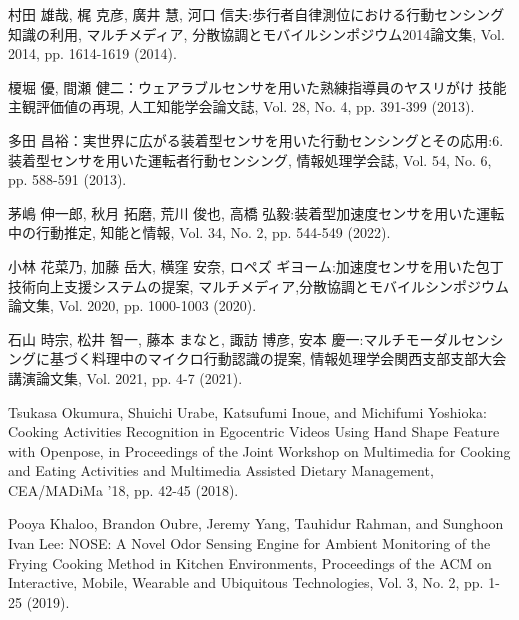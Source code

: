 \begin{thebibliography}{参考文献}
	村田 雄哉, 梶 克彦, 廣井 慧, 河口 信夫:歩行者自律測位における行動センシング知識の利用, マルチメディア, 分散協調とモバイルシンポジウム2014論文集, Vol. 2014, pp. 1614-1619 (2014).
	
	榎堀 優, 間瀬 健二：ウェアラブルセンサを用いた熟練指導員のヤスリがけ
	技能主観評価値の再現, 人工知能学会論文誌, Vol. 28, No. 4, pp. 391-399 (2013).
	
	多田 昌裕：実世界に広がる装着型センサを用いた行動センシングとその応用:6. 装着型センサを用いた運転者行動センシング, 情報処理学会誌, Vol. 54, No. 6, pp. 588-591 (2013).

	茅嶋 伸一郎, 秋月 拓磨, 荒川 俊也, 高橋 弘毅:装着型加速度センサを用いた運転中の行動推定, 知能と情報, Vol. 34, No. 2, pp. 544-549 (2022).


	小林 花菜乃, 加藤 岳大, 横窪 安奈, ロペズ ギヨーム:加速度センサを用いた包丁技術向上支援システムの提案, マルチメディア,分散協調とモバイルシンポジウム論文集, Vol. 2020, pp. 1000-1003 (2020).
	
	石山 時宗, 松井 智一, 藤本 まなと, 諏訪 博彦, 安本 慶一:マルチモーダルセンシングに基づく料理中のマイクロ行動認識の提案, 情報処理学会関西支部支部大会講演論文集, Vol. 2021, pp. 4-7 (2021).

	Tsukasa Okumura, Shuichi Urabe, Katsufumi Inoue, and Michifumi Yoshioka: Cooking Activities Recognition in Egocentric Videos Using Hand Shape Feature with Openpose, in Proceedings of the Joint Workshop on Multimedia for Cooking and Eating Activities and Multimedia Assisted Dietary Management, CEA/MADiMa '18, pp. 42-45 (2018).

	Pooya Khaloo, Brandon Oubre, Jeremy Yang, Tauhidur Rahman, and Sunghoon Ivan Lee: NOSE: A Novel Odor Sensing Engine for Ambient Monitoring of the Frying Cooking Method in Kitchen Environments, Proceedings of the ACM on Interactive, Mobile, Wearable and Ubiquitous Technologies, Vol. 3, No. 2, pp. 1-25 (2019).


\end{thebibliography}
